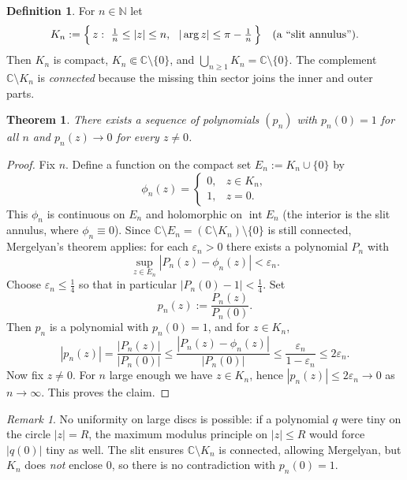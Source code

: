 \documentclass[11pt,a4paper]{article}
\newtheorem{theorem}{Theorem}
\theoremstyle{definition}
\theoremstyle{definition}
\newtheorem{definition}[exercise]{Definition}
\theoremstyle{plain}
\theoremstyle{remark}
\newtheorem{remark}[exercise]{Remark}
\begin{document}
\begin{definition}
	For $n\in\mathbb N$ let
	\[
	K_n:=\Bigl\{\,z:\ \tfrac1n\le |z|\le n,\ \ |\arg z|\le \pi-\tfrac1n\,\Bigr\}
	\quad(\text{a ``slit annulus''}).
	\]
	Then $K_n$ is compact, $K_n\Subset\mathbb C\setminus\{0\}$, and
	$\bigcup_{n\ge1}K_n=\mathbb C\setminus\{0\}$. The complement
	$\mathbb C\setminus K_n$ is \emph{connected} because the missing
	thin sector joins the inner and outer parts.
\end{definition}

\begin{theorem}
	There exists a sequence of polynomials $(p_n)$ with $p_n(0)=1$ for all $n$ and
	$p_n(z)\to0$ for every $z\neq0$.
\end{theorem}

\begin{proof}
	Fix $n$. Define a function on the compact set $E_n:=K_n\cup\{0\}$ by
	\[
	\phi_n(z)=\begin{cases}
		0,&z\in K_n,\\
		1,&z=0.
	\end{cases}
	\]
	This $\phi_n$ is continuous on $E_n$ and holomorphic on $\operatorname{int}E_n$
	(the interior is the slit annulus, where $\phi_n\equiv0$). Since
	$\mathbb C\setminus E_n=(\mathbb C\setminus K_n)\setminus\{0\}$ is still connected,
	Mergelyan’s theorem applies: for each $\varepsilon_n>0$ there exists a polynomial
	$P_n$ with
	\[
	\sup_{z\in E_n}|P_n(z)-\phi_n(z)|<\varepsilon_n.
	\]
	Choose $\varepsilon_n\le \tfrac{1}{4}$ so that in particular $|P_n(0)-1|<\tfrac14$.
	Set
	\[
	p_n(z):=\frac{P_n(z)}{P_n(0)}.
	\]
	Then $p_n$ is a polynomial with $p_n(0)=1$, and for $z\in K_n$,
	\[
	|p_n(z)|=\frac{|P_n(z)|}{|P_n(0)|}\le
	\frac{|P_n(z)-\phi_n(z)|}{|P_n(0)|}\le \frac{\varepsilon_n}{1-\varepsilon_n}
	\le 2\varepsilon_n .
	\]
	Now fix $z\neq0$. For $n$ large enough we have $z\in K_n$, hence
	$|p_n(z)|\le 2\varepsilon_n \to 0$ as $n\to\infty$. This proves the claim.
\end{proof}

\begin{remark}
	No uniformity on large discs is possible: if a polynomial $q$ were tiny on the
	circle $|z|=R$, the maximum modulus principle on $|z|\le R$ would force $|q(0)|$
	tiny as well. The slit ensures $\mathbb C\setminus K_n$ is connected, allowing
	Mergelyan, but $K_n$ does \emph{not} enclose $0$, so there is no contradiction
	with $p_n(0)=1$.
\end{remark}
\end{document}
